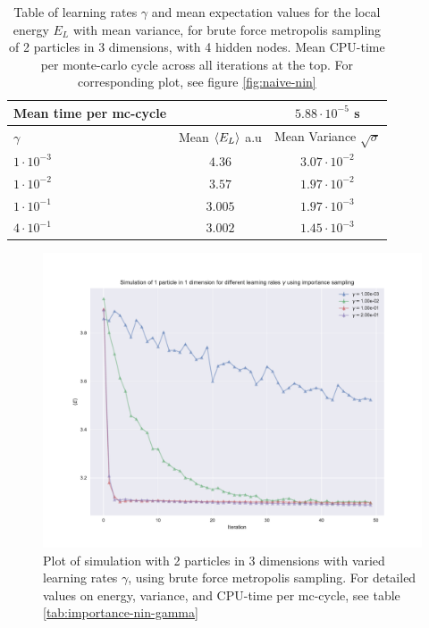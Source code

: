 \begin{table}[h]
\begin{tabular}{l c c}
	Mean time per mc-cycle & &$5.88\cdot10^{-5}$ s \\
	\hline
	$\gamma$ & Mean $\langle E_L \rangle$ a.u & Mean Variance $\sqrt{\sigma}$\\
	\hline
	$1\cdot10^{-3}$ & $4.36$ & $3.07\cdot10^{-2}$ \\
	$1\cdot10^{-2}$ & $3.57$ & $1.97\cdot10^{-2}$ \\
	$1\cdot10^{-1}$ & $3.005$ & $1.97\cdot10^{-3}$ \\
	$4\cdot10^{-1}$ & $3.002$ & $1.45\cdot10^{-3}$ \\
\end{tabular}
\label{tab:naive-nin}
\caption{Table of learning rates $\gamma$ and mean expectation values for the local energy $E_L$ with mean variance, for brute force metropolis sampling
		of 2 particles in 3 dimensions, with 4 hidden nodes.
		Mean CPU-time per monte-carlo cycle across all iterations at the top.
	For corresponding plot, see figure \ref{fig:naive-nin}}
\end{table}

\begin{figure}[h]
\hspace{-2.8cm}
\includegraphics[width = \paperwidth]{figures/importance_2p_3d.pdf}
\caption{Plot of simulation with 2 particles in 3 dimensions with varied learning rates $\gamma$, using brute force metropolis sampling.
			For detailed values on energy, variance, and CPU-time per mc-cycle, see table \ref{tab:importance-nin-gamma}}
\label{fig:importance-nin-gamma}
\end{figure}

